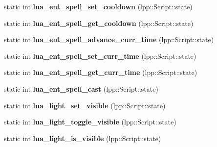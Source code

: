 \begin{DoxyCompactItemize}
\item 
static int {\bfseries lua\+\_\+ent\+\_\+spell\+\_\+set\+\_\+cooldown} (lpp\+::\+Script\+::state)\hypertarget{class_lua_interface_aa609cb55206d0c75778733454165d519}{}\label{class_lua_interface_aa609cb55206d0c75778733454165d519}

\item 
static int {\bfseries lua\+\_\+ent\+\_\+spell\+\_\+get\+\_\+cooldown} (lpp\+::\+Script\+::state)\hypertarget{class_lua_interface_a6a7c34bcf405c752f16a7188280cd4d0}{}\label{class_lua_interface_a6a7c34bcf405c752f16a7188280cd4d0}

\item 
static int {\bfseries lua\+\_\+ent\+\_\+spell\+\_\+advance\+\_\+curr\+\_\+time} (lpp\+::\+Script\+::state)\hypertarget{class_lua_interface_a4c8afa4f9edda627bfa52eb798dfc259}{}\label{class_lua_interface_a4c8afa4f9edda627bfa52eb798dfc259}

\item 
static int {\bfseries lua\+\_\+ent\+\_\+spell\+\_\+set\+\_\+curr\+\_\+time} (lpp\+::\+Script\+::state)\hypertarget{class_lua_interface_aeeb2523f2e6644fb492bc5487753f5bb}{}\label{class_lua_interface_aeeb2523f2e6644fb492bc5487753f5bb}

\item 
static int {\bfseries lua\+\_\+ent\+\_\+spell\+\_\+get\+\_\+curr\+\_\+time} (lpp\+::\+Script\+::state)\hypertarget{class_lua_interface_a9e7805649c2c52212bf238ebd2e701d3}{}\label{class_lua_interface_a9e7805649c2c52212bf238ebd2e701d3}

\item 
static int {\bfseries lua\+\_\+ent\+\_\+spell\+\_\+cast} (lpp\+::\+Script\+::state)\hypertarget{class_lua_interface_aaa825a6b69d04c2c5a9452b92152361f}{}\label{class_lua_interface_aaa825a6b69d04c2c5a9452b92152361f}

\item 
static int {\bfseries lua\+\_\+light\+\_\+set\+\_\+visible} (lpp\+::\+Script\+::state)\hypertarget{class_lua_interface_a1accd629ac896d7caa655be8f2fe1d15}{}\label{class_lua_interface_a1accd629ac896d7caa655be8f2fe1d15}

\item 
static int {\bfseries lua\+\_\+light\+\_\+toggle\+\_\+visible} (lpp\+::\+Script\+::state)\hypertarget{class_lua_interface_a80ae7cdf247b9db05bfbab4da33d028e}{}\label{class_lua_interface_a80ae7cdf247b9db05bfbab4da33d028e}

\item 
static int {\bfseries lua\+\_\+light\+\_\+is\+\_\+visible} (lpp\+::\+Script\+::state)\hypertarget{class_lua_interface_a021cfadb2ab0f4c9f90e4e4f197dad8c}{}\label{class_lua_interface_a021cfadb2ab0f4c9f90e4e4f197dad8c}


\end{DoxyCompactItemize}
